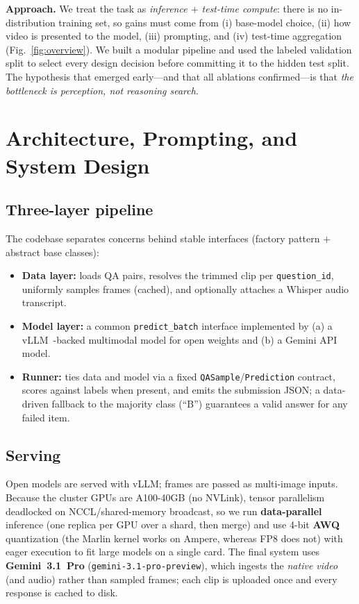 \documentclass[10pt,twocolumn,letterpaper]{article}
\begin{document}
\textbf{Approach.} We treat the task as \emph{inference $+$ test-time compute}: there is no
in-distribution training set, so gains must come from (i) base-model choice, (ii) how video is
presented to the model, (iii) prompting, and (iv) test-time aggregation (Fig.~\ref{fig:overview}). We
built a modular pipeline and used the labeled validation split to select every design decision before
committing it to the hidden test split. The hypothesis that emerged early---and that all ablations
confirmed---is that \emph{the bottleneck is perception, not reasoning search}.

\section{Architecture, Prompting, and System Design}
\subsection{Three-layer pipeline}
The codebase separates concerns behind stable interfaces (factory pattern $+$ abstract base classes):
\begin{itemize}[leftmargin=1.2em,itemsep=1pt]
  \item \textbf{Data layer:} loads QA pairs, resolves the trimmed clip per \texttt{question\_id},
  uniformly samples frames (cached), and optionally attaches a Whisper audio transcript.
  \item \textbf{Model layer:} a common \texttt{predict\_batch} interface implemented by (a) a
  vLLM~\cite{vllm}-backed multimodal model for open weights and (b) a Gemini API model.
  \item \textbf{Runner:} ties data and model via a fixed \texttt{QASample}/\texttt{Prediction}
  contract, scores against labels when present, and emits the submission JSON; a data-driven fallback
  to the majority class (``B'') guarantees a valid answer for any failed item.
\end{itemize}

\subsection{Serving}
Open models are served with vLLM; frames are passed as multi-image inputs. Because the cluster GPUs
are A100-40GB (no NVLink), tensor parallelism deadlocked on NCCL/shared-memory broadcast, so we run
\textbf{data-parallel} inference (one replica per GPU over a shard, then merge) and use 4-bit
\textbf{AWQ} quantization (the Marlin kernel works on Ampere, whereas FP8 does not) with eager
execution to fit large models on a single card. The final system uses \textbf{Gemini~3.1~Pro}
(\texttt{gemini-3.1-pro-preview}), which ingests the \emph{native video} (and audio) rather than
sampled frames; each clip is uploaded once and every response is cached to disk.
\end{document}
